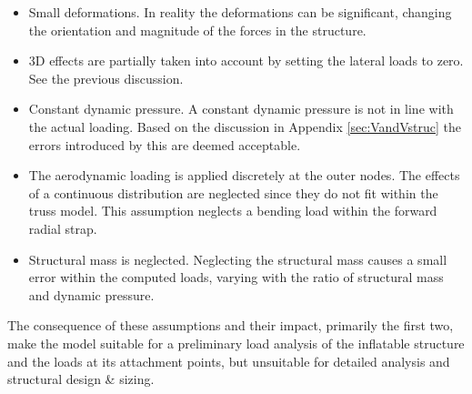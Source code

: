 \begin{itemize}
\item Small deformations. In reality the deformations can be significant, changing the orientation and magnitude of the forces in the structure.
\item 3D effects are partially taken into account by setting the lateral loads to zero. See the previous discussion.
\item Constant dynamic pressure. A constant dynamic pressure is not in line with the actual loading. Based on the discussion in Appendix \ref{sec:VandVstruc} the errors introduced by this are deemed acceptable.
\item The aerodynamic loading is applied discretely at the outer nodes. The effects of a continuous distribution are neglected since they do not fit within the truss model. This assumption neglects a bending load within the forward radial strap. 
\item Structural mass is neglected. Neglecting the structural mass causes a small error within the computed loads, varying with the ratio of structural mass and dynamic pressure.
\end{itemize} 
The consequence of these assumptions and their impact, primarily the first two, make the model suitable for a preliminary load analysis of the inflatable structure and the loads at its attachment points, but unsuitable for detailed analysis and structural design \& sizing. %





